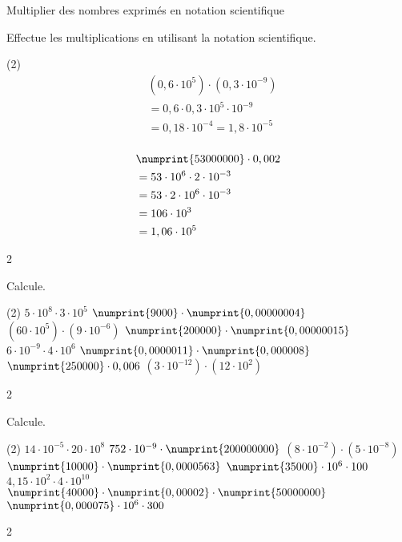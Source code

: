 \documentclass[a4paper,11pt]{report}
\begin{document}
\begin{resolu}{Multiplier des nombres exprimés en notation scientifique}{
Effectue les multiplications en utilisant la notation scientifique.
\begin{tasks}(2)
    \task \addtolength{\jot}{3mm}    
            \begin{align*}
            &(0,6\cdot10^5)\cdot(0,3\cdot10^{-9})\\
            &=0,6\cdot0,3\cdot10^5\cdot10^{-9}\\
            &=0,18\cdot10^{-4}=1,8\cdot10^{-5}\\
            \end{align*}
            
    
    \task \addtolength{\jot}{3mm}    
            \begin{align*}
            &\numprint{53000000}\cdot0,002\\
            &=53\cdot10^6\cdot2\cdot10^{-3}\\
            &=53\cdot2\cdot10^6\cdot10^{-3}\\
            &=106\cdot10^3\\
            &=1,06\cdot10^5
            \end{align*}
             
\end{tasks}
}{2}    
\end{resolu}

\begin{exo}{
Calcule.
\begin{tasks}(2)
    \task $5\cdot10^8\cdot3\cdot10^5$
    \task $\numprint{9000}\cdot\numprint{0,00000004}$
    \task $(60\cdot10^5)\cdot(9\cdot10^{-6})$
    \task $\numprint{200000}\cdot\numprint{0,00000015}$
    \task $6\cdot10^{-9}\cdot4\cdot10^6$
    \task $\numprint{0,0000011}\cdot\numprint{0,000008}$
    \task $\numprint{250000}\cdot0,006$
    \task $(3\cdot10^{-12})\cdot(12\cdot10^2)$
\end{tasks}
}{2}    
\end{exo}

\begin{exo}{
Calcule.
\begin{tasks}(2)
    \task $14\cdot10^{-5}\cdot20\cdot10^8$
    \task $752\cdot10^{-9}\cdot\numprint{200000000}$
    \task $(8\cdot10^{-2})\cdot(5\cdot10^{-8})$
    \task $\numprint{10000}\cdot\numprint{0,0000563}$
    \task $\numprint{35000}\cdot10^6\cdot100$
    \task $4,15\cdot10^2\cdot4\cdot10^{10}$
    \task $\numprint{40000}\cdot\numprint{0,00002}\cdot\numprint{50000000}$
    \task $\numprint{0,000075}\cdot10^6\cdot300$
\end{tasks}
}{2}    
\end{exo}
\end{document}
